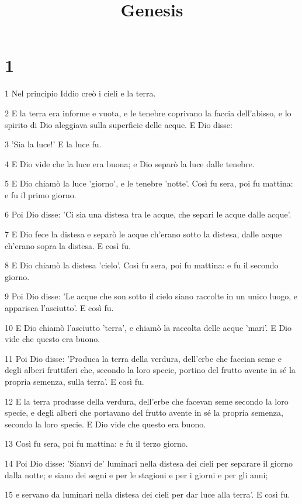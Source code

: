 

\title{Genesis}


\chapter{1}

\par 1 Nel principio Iddio creò i cieli e la terra.
\par 2 E la terra era informe e vuota, e le tenebre coprivano la faccia dell'abisso, e lo spirito di Dio aleggiava sulla superficie delle acque. E Dio disse:
\par 3 'Sia la luce!' E la luce fu.
\par 4 E Dio vide che la luce era buona; e Dio separò la luce dalle tenebre.
\par 5 E Dio chiamò la luce 'giorno', e le tenebre 'notte'. Così fu sera, poi fu mattina: e fu il primo giorno.
\par 6 Poi Dio disse: 'Ci sia una distesa tra le acque, che separi le acque dalle acque'.
\par 7 E Dio fece la distesa e separò le acque ch'erano sotto la distesa, dalle acque ch'erano sopra la distesa. E così fu.
\par 8 E Dio chiamò la distesa 'cielo'. Così fu sera, poi fu mattina: e fu il secondo giorno.
\par 9 Poi Dio disse: 'Le acque che son sotto il cielo siano raccolte in un unico luogo, e apparisca l'asciutto'. E così fu.
\par 10 E Dio chiamò l'asciutto 'terra', e chiamò la raccolta delle acque 'mari'. E Dio vide che questo era buono.
\par 11 Poi Dio disse: 'Produca la terra della verdura, dell'erbe che faccian seme e degli alberi fruttiferi che, secondo la loro specie, portino del frutto avente in sé la propria semenza, sulla terra'. E così fu.
\par 12 E la terra produsse della verdura, dell'erbe che facevan seme secondo la loro specie, e degli alberi che portavano del frutto avente in sé la propria semenza, secondo la loro specie. E Dio vide che questo era buono.
\par 13 Così fu sera, poi fu mattina: e fu il terzo giorno.
\par 14 Poi Dio disse: 'Sianvi de' luminari nella distesa dei cieli per separare il giorno dalla notte; e siano dei segni e per le stagioni e per i giorni e per gli anni;
\par 15 e servano da luminari nella distesa dei cieli per dar luce alla terra'. E così fu.
